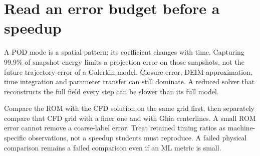 \section*{Read an error budget before a speedup}
A POD mode is a spatial pattern; its coefficient changes with time. Capturing
99.9\% of snapshot energy limits a projection error on those snapshots, not the
future trajectory error of a Galerkin model. Closure error, DEIM approximation,
time integration and parameter transfer can still dominate. A reduced solver
that reconstructs the full field every step can be slower than its full model.

Compare the ROM with the CFD solution on the same grid first, then separately
compare that CFD grid with a finer one and with Ghia centerlines. A small ROM
error cannot remove a coarse-label error. Treat retained timing ratios as
machine-specific observations, not a speedup students must reproduce. A failed
physical comparison remains a failed comparison even if an ML metric is small.
